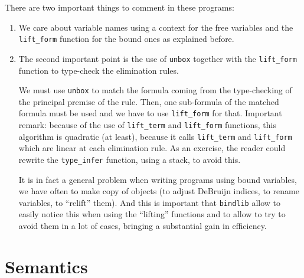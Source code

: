 \documentclass[11pt]{article}
\begin{document}
There are two important things to comment in these programs:
\begin{enumerate}
\item We care about variable names using a context for the free
  variables and the \verb#lift_form# function for the bound ones as explained
  before.

\item The second important point is the use of \verb#unbox# together
with the \verb#lift_form# function to type-check the elimination rules.

We must use \verb#unbox# to match the formula coming from the
type-checking of the principal premise of the rule. Then, one
sub-formula of the matched formula must be used and we have to use
\verb#lift_form# for that.
Important remark: because of the use of \verb#lift_term# and
\verb#lift_form# functions, this algorithm is quadratic (at least), because
it calls \verb#lift_term# and \verb#lift_form# which are linear at
each elimination rule. As an exercise, the reader could rewrite the
\verb#type_infer# function, using a stack, to avoid this.

It is in fact a general problem when writing programs using bound
variables, we have often to make copy of objects (to adjust DeBruijn
indices, to rename variables, to ``relift'' them). And this is
important that \verb#bindlib# allow to easily notice this when using
the ``lifting'' functions and to allow to try to avoid them in a lot of cases,
bringing a substantial gain in efficiency.
\end{enumerate}

\section{Semantics}
\end{document}
